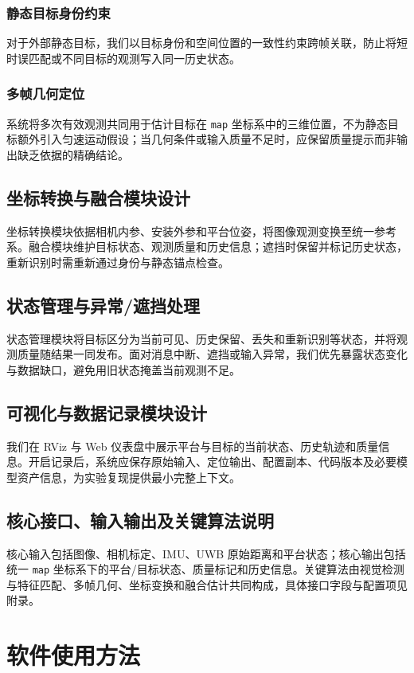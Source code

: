 \documentclass[UTF8,a4paper,12pt]{ctexart}
\begin{document}
\subsubsection{静态目标身份约束}
对于外部静态目标，我们以目标身份和空间位置的一致性约束跨帧关联，防止将短时误匹配或不同目标的观测写入同一历史状态。

\subsubsection{多帧几何定位}
系统将多次有效观测共同用于估计目标在 \texttt{map} 坐标系中的三维位置，不为静态目标额外引入匀速运动假设；当几何条件或输入质量不足时，应保留质量提示而非输出缺乏依据的精确结论。

\subsection{坐标转换与融合模块设计}
坐标转换模块依据相机内参、安装外参和平台位姿，将图像观测变换至统一参考系。融合模块维护目标状态、观测质量和历史信息；遮挡时保留并标记历史状态，重新识别时需重新通过身份与静态锚点检查。

\subsection{状态管理与异常/遮挡处理}
状态管理模块将目标区分为当前可见、历史保留、丢失和重新识别等状态，并将观测质量随结果一同发布。面对消息中断、遮挡或输入异常，我们优先暴露状态变化与数据缺口，避免用旧状态掩盖当前观测不足。

\subsection{可视化与数据记录模块设计}
我们在 RViz 与 Web 仪表盘中展示平台与目标的当前状态、历史轨迹和质量信息。开启记录后，系统应保存原始输入、定位输出、配置副本、代码版本及必要模型资产信息，为实验复现提供最小完整上下文。

\subsection{核心接口、输入输出及关键算法说明}
核心输入包括图像、相机标定、IMU、UWB 原始距离和平台状态；核心输出包括统一 \texttt{map} 坐标系下的平台/目标状态、质量标记和历史信息。关键算法由视觉检测与特征匹配、多帧几何、坐标变换和融合估计共同构成，具体接口字段与配置项见附录。

\section{软件使用方法}\label{sec:usage}
\end{document}
